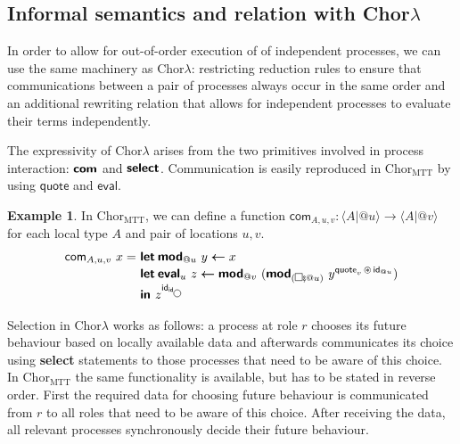 \documentclass{scrartcl}
\theoremstyle{definition}
\newtheorem{example}{Example}
\theoremstyle{plain}
\renewcommand{\square}%
  {\tikz{\draw (0,0) rectangle (0.2cm,0.2cm);}}
\renewcommand{\circle}%
  {\tikz{\draw (0,0) circle [radius=0.1cm];}}
\newcommand{\primitive}[1]{\textsf{\textbf{#1}}}
\newcommand{\ChorMTT}{Chor${}_{\textrm{MTT}}$}
\begin{document}
\subsection{Informal semantics and relation with
  \texorpdfstring{Chor$\lambda$}{ChorLambda}}
In order to allow for out-of-order execution of of independent processes, we
can use the same machinery as Chor$\lambda$: restricting reduction rules to
ensure that communications between a pair of processes always occur in the same
order and an additional rewriting relation that allows for independent
processes to evaluate their terms independently.

The expressivity of Chor$\lambda$ arises from the two primitives involved in
process interaction: $\primitive{com}$ and $\primitive{select}$. Communication
is easily reproduced in \ChorMTT{} by using $\textsf{quote}$ and
$\textsf{eval}$.
\begin{example}
  In \ChorMTT, we can define a function $\textsf{com}_{A,u,v} : \langle A | @u
  \rangle \to \langle A | @v \rangle$ for each local type $A$ and pair of
  locations $u,v$.
  \begin{align*}
    \textsf{com}_{A,u,v}\ x =
    \ & \primitive{let}\:\primitive{mod}_{@u}\ y \bm{\leftarrow} x\\[-3pt]
      & \primitive{let}\:\primitive{eval}_u\ z \bm{\leftarrow} \primitive{mod}_{@v}\ (\primitive{mod}_{(\square \fatsemi @u)}\ 
        y^{\textsf{quote}_v \,\circledast\, \textsf{id}_{@u}})\\[-3pt]
      & \primitive{in } z^{\textsf{id}_{\textsf{id}_{\circle}}}
  \end{align*}
\end{example}
\noindent
Selection in Chor$\lambda$ works as follows: a process at role $r$ chooses its
future behaviour based on locally available data and afterwards communicates
its choice using \primitive{select} statements to those processes that need to
be aware of this choice. In \ChorMTT{} the same functionality is available, but
has to be stated in reverse order. First the required data for choosing future
behaviour is communicated from $r$ to all roles that need to be aware of this
choice. After receiving the data, all relevant processes synchronously decide
their future behaviour.
\end{document}
